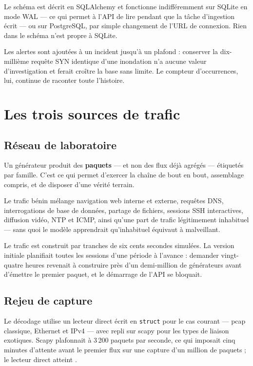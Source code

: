 \documentclass[11pt,a4paper]{article}
\begin{document}
Le schéma est décrit en SQLAlchemy et fonctionne indifféremment sur SQLite en mode WAL --- ce qui
permet à l'API de lire pendant que la tâche d'ingestion écrit --- ou sur PostgreSQL, par simple
changement de l'URL de connexion. Rien dans le schéma n'est propre à SQLite.

Les alertes sont ajoutées à un incident jusqu'à un plafond : conserver la dix-millième requête SYN
identique d'une inondation n'a aucune valeur d'investigation et ferait croître la base sans limite.
Le compteur d'occurrences, lui, continue de raconter toute l'histoire.

\section{Les trois sources de trafic}

\subsection{Réseau de laboratoire}

Un générateur produit des \textbf{paquets} --- et non des flux déjà agrégés --- étiquetés par
famille. C'est ce qui permet d'exercer la chaîne de bout en bout, assemblage compris, et de disposer
d'une vérité terrain.

Le trafic bénin mélange navigation web interne et externe, requêtes DNS, interrogations de base de
données, partage de fichiers, sessions SSH interactives, diffusion vidéo, NTP et ICMP, ainsi qu'une
part de trafic légitimement inhabituel --- sans quoi le modèle apprendrait qu'inhabituel équivaut à
malveillant.

Le trafic est construit par tranches de six cents secondes simulées. La version initiale planifiait
toutes les sessions d'une période à l'avance : demander vingt-quatre heures revenait à construire
près d'un demi-million de générateurs avant d'émettre le premier paquet, et le démarrage de l'API se
bloquait.

\subsection{Rejeu de capture}

Le décodage utilise un lecteur direct écrit en \texttt{struct} pour le cas courant --- pcap
classique, Ethernet et IPv4 --- avec repli sur scapy pour les types de liaison exotiques. Scapy
plafonnait à 3\,200 paquets par seconde, ce qui imposait cinq minutes d'attente avant le premier
flux sur une capture d'un million de paquets ; le lecteur direct atteint .
\end{document}
